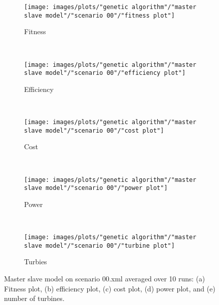 \begin{figure}[h!]
    \centering
      \begin{subfigure}[b]{0.31\textwidth}
        \texttt{[image: images/plots/"genetic algorithm"/"master slave model"/"scenario 00"/"fitness plot"]}
        \caption{Fitness}
        \hfill
        \label{plot:master slave model fitness plot scenario 00}
    \end{subfigure}
    ~
      \begin{subfigure}[b]{0.31\textwidth}
        \texttt{[image: images/plots/"genetic algorithm"/"master slave model"/"scenario 00"/"efficiency plot"]}
        \caption{Efficiency}
        \hfill
        \label{plot:single point crossover}
    \end{subfigure}
    ~
    \begin{subfigure}[b]{0.31\textwidth}
        \texttt{[image: images/plots/"genetic algorithm"/"master slave model"/"scenario 00"/"cost plot"]}
        \caption{Cost}
        \hfill
        \label{plot:single point crossover}
    \end{subfigure}
    ~
    \begin{subfigure}[b]{0.31\textwidth}
        \texttt{[image: images/plots/"genetic algorithm"/"master slave model"/"scenario 00"/"power plot"]}
        \caption{Power}
        \hfill
        \label{plot:two point crossover}
    \end{subfigure}
    ~
    \begin{subfigure}[b]{0.31\textwidth}
        \texttt{[image: images/plots/"genetic algorithm"/"master slave model"/"scenario 00"/"turbine plot"]}
        \caption{Turbies}
        \hfill
        \label{plot:uniform crossover}
    \end{subfigure}
    \caption{Master slave model on scenario 00.xml averaged over 10 runs: (a) Fitness plot, (b) efficiency plot, (c) cost plot, (d) power plot, and (e) number of turbines.}
    \label{plot:master slave scenario 00}
\end{figure}


